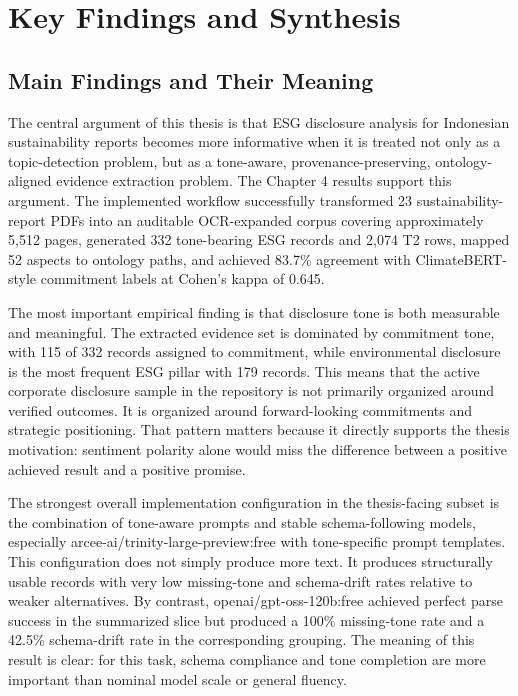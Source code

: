 \section{Key Findings and Synthesis}

\subsection{Main Findings and Their Meaning}

The central argument of this thesis is that ESG disclosure analysis for Indonesian sustainability reports becomes more informative when it is treated not only as a topic-detection problem, but as a tone-aware, provenance-preserving, ontology-aligned evidence extraction problem. The Chapter 4 results support this argument. The implemented workflow successfully transformed 23 sustainability-report PDFs into an auditable OCR-expanded corpus covering approximately 5,512 pages, generated 332 tone-bearing ESG records and 2,074 T2 rows, mapped 52 aspects to ontology paths, and achieved 83.7\% agreement with ClimateBERT-style commitment labels at Cohen’s kappa of 0.645.

The most important empirical finding is that disclosure tone is both measurable and meaningful. The extracted evidence set is dominated by commitment tone, with 115 of 332 records assigned to commitment, while environmental disclosure is the most frequent ESG pillar with 179 records. This means that the active corporate disclosure sample in the repository is not primarily organized around verified outcomes. It is organized around forward-looking commitments and strategic positioning. That pattern matters because it directly supports the thesis motivation: sentiment polarity alone would miss the difference between a positive achieved result and a positive promise.

The strongest overall implementation configuration in the thesis-facing subset is the combination of tone-aware prompts and stable schema-following models, especially arcee-ai/trinity-large-preview:free with tone-specific prompt templates. This configuration does not simply produce more text. It produces structurally usable records with very low missing-tone and schema-drift rates relative to weaker alternatives. By contrast, openai/gpt-oss-120b:free achieved perfect parse success in the summarized slice but produced a 100\% missing-tone rate and a 42.5\% schema-drift rate in the corresponding grouping. The meaning of this result is clear: for this task, schema compliance and tone completion are more important than nominal model scale or general fluency.

